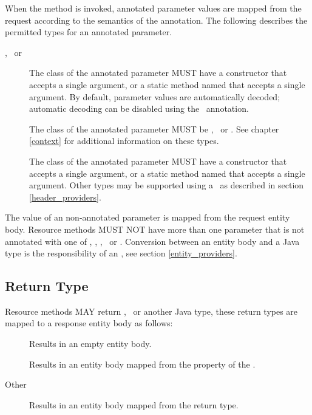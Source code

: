 When the method is invoked, annotated parameter values are mapped from the request according to the semantics of the annotation. The following describes the permitted types for an annotated parameter.
\begin{description}
\item[\MatrixParam, \QueryParam\ or \UriParam] The class of the annotated parameter MUST have a constructor that accepts a single  argument, or a static method named  that accepts a single  argument. By default, parameter values are automatically decoded; automatic decoding can be disabled using the \Encoded\ annotation.
\item[\HttpContext] The class of the annotated parameter MUST be \UriInfo, \PreconditionEvaluator\ or \HttpHeaders. See chapter \ref{context} for additional information on these types.
\item[\HeaderParam] The class of the annotated parameter MUST have a constructor that accepts a single  argument, or a static method named  that accepts a single  argument. Other types may be supported using a \HeaderProvider\ as described in section \ref{header_providers}.
\end{description}

The value of an non-annotated  parameter is mapped from the request entity body. Resource methods MUST NOT have more than one parameter that is not annotated with one of \HttpContext, \HeaderParam, \MatrixParam, \QueryParam\ or \UriParam. Conversion between an entity body and a Java type is the responsibility of an \EntityProvider, see section \ref{entity_providers}.

\subsection{Return Type}
\label{resource_method_return}

Resource methods MAY return , \Response\ or another Java type, these return types are mapped to a response entity body as follows:

\begin{description}
\item[] Results in an empty entity body.
\item[ \Response] Results in an entity body mapped from the  property of the \Response.
\item[Other] Results in an entity body mapped from the return type.
\end{description}

